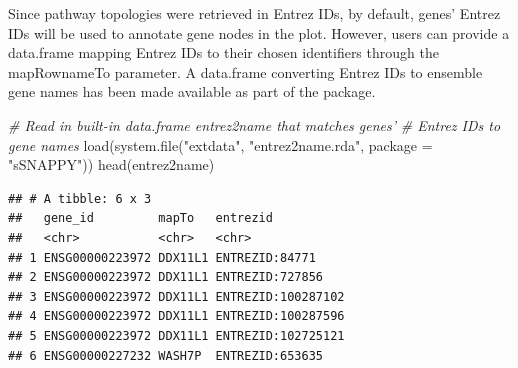 \documentclass[9pt,a4paper,]{extarticle}
\newenvironment{Shaded}{\begin{snugshade}}{\end{snugshade}}
\newcommand{\AttributeTok}[1]{\textcolor[rgb]{0.77,0.63,0.00}{#1}}
\newcommand{\CommentTok}[1]{\textcolor[rgb]{0.56,0.35,0.01}{\textit{#1}}}
\newcommand{\ConstantTok}[1]{\textcolor[rgb]{0.00,0.00,0.00}{#1}}
\newcommand{\DecValTok}[1]{\textcolor[rgb]{0.00,0.00,0.81}{#1}}
\newcommand{\FunctionTok}[1]{\textcolor[rgb]{0.00,0.00,0.00}{#1}}
\newcommand{\NormalTok}[1]{#1}
\newcommand{\OtherTok}[1]{\textcolor[rgb]{0.56,0.35,0.01}{#1}}
\newcommand{\SpecialCharTok}[1]{\textcolor[rgb]{0.00,0.00,0.00}{#1}}
\newcommand{\StringTok}[1]{\textcolor[rgb]{0.31,0.60,0.02}{#1}}
\begin{document}
\begin{Shaded}
\end{Shaded}

Since pathway topologies were retrieved in Entrez IDs, by default, genes' Entrez IDs will be used to annotate gene nodes in the plot. However, users can provide a data.frame mapping Entrez IDs to their chosen identifiers through the mapRownameTo parameter. A data.frame converting Entrez IDs to ensemble gene names has been made available as part of the package.

\begin{Shaded}
\begin{Highlighting}[]
\CommentTok{\# Read in built{-}in data.frame entrez2name that matches genes’ }
\CommentTok{\# Entrez IDs to gene names}
\FunctionTok{load}\NormalTok{(}\FunctionTok{system.file}\NormalTok{(}\StringTok{"extdata"}\NormalTok{, }\StringTok{"entrez2name.rda"}\NormalTok{, }\AttributeTok{package =} \StringTok{"sSNAPPY"}\NormalTok{))}
\FunctionTok{head}\NormalTok{(entrez2name)}
\end{Highlighting}
\end{Shaded}

\begin{verbatim}
## # A tibble: 6 x 3
##   gene_id         mapTo   entrezid          
##   <chr>           <chr>   <chr>             
## 1 ENSG00000223972 DDX11L1 ENTREZID:84771    
## 2 ENSG00000223972 DDX11L1 ENTREZID:727856   
## 3 ENSG00000223972 DDX11L1 ENTREZID:100287102
## 4 ENSG00000223972 DDX11L1 ENTREZID:100287596
## 5 ENSG00000223972 DDX11L1 ENTREZID:102725121
## 6 ENSG00000227232 WASH7P  ENTREZID:653635
\end{verbatim}
\end{document}
